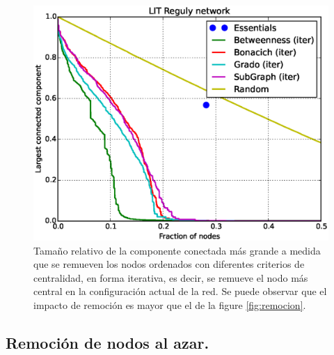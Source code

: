 \begin{figure}
\includegraphics[scale = 0.30]{figuras/LIT_Reguly} 
\caption{Tamaño relativo de la componente conectada más grande a medida que se remueven los nodos ordenados con diferentes criterios de centralidad, en forma iterativa, es decir, se remueve el nodo más central en la configuración actual de la red. Se puede observar que el impacto de remoción es mayor que el de la figure \ref{fig:remocion}.}
\label{fig:remocion_alternativo}
\end{figure}

\subsection{Remoción de nodos al azar.}

